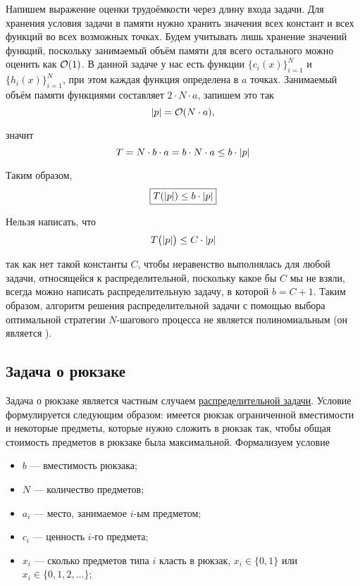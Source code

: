 Напишем выражение оценки трудоёмкости через длину входа задачи. Для хранения условия задачи в памяти нужно хранить значения всех констант и всех функций во всех возможных точках. Будем учитывать лишь хранение значений функций, поскольку занимаемый объём памяти для всего остального можно оценить как $\mathcal{O}(1)$. В данной задаче у нас есть функции $\{c_i(x)\}_{i=1}^N$ и $\{h_i(x)\}_{i=1}^N$, при этом каждая функция определена в $a$ точках. Занимаемый объём памяти функциями составляет $2 \cdot N \cdot a$, запишем это так
\[
\abs{p} = \mathcal{O}(N \cdot a),
\]

значит
\[
T = N \cdot b \cdot a = b \cdot N \cdot a \le b \cdot \abs{p}
\]

Таким образом,
\[
\boxed{T(\abs{p}) \le b \cdot \abs{p}}
\]

\remark

Нельзя написать, что
\[
T\big(\abs{p}\big) \le C \cdot \abs{p}
\]

так как нет такой константы $C$, чтобы неравенство выполнялась для любой задачи, относящейся к распределительной, поскольку какое бы $C$ мы не взяли, всегда можно написать распределительную задачу, в которой $b = C + 1$. Таким образом, алгоритм решения распределительной задачи с помощью выбора оптимальной стратегии $N$-шагового процесса не является полиномиальным (он является ).

\subsection{Задача о рюкзаке}

\problem[о рюкзаке]

Задача о рюкзаке является частным случаем \hyperref[pr:distribution]{распределительной задачи}. Условие формулируется следующим образом: имеется рюкзак ограниченной вместимости и некоторые предметы, которые нужно сложить в рюкзак так, чтобы общая стоимость предметов в рюкзаке была максимальной. Формализуем условие

\begin{itemize}[nosep]
	\item $b$ --- вместимость рюкзака;
	
	\item $N$ --- количество предметов;
	
	\item $a_i$ --- место, занимаемое $i$-ым предметом;
	
	\item $c_i$ --- ценность $i$-го предмета;
	
	\item $x_i$ --- сколько предметов типа $i$ класть в рюкзак, $x_i \in \{0, 1\}$ или $x_i \in \{0, 1, 2, \dots\}$;
\end{itemize}

